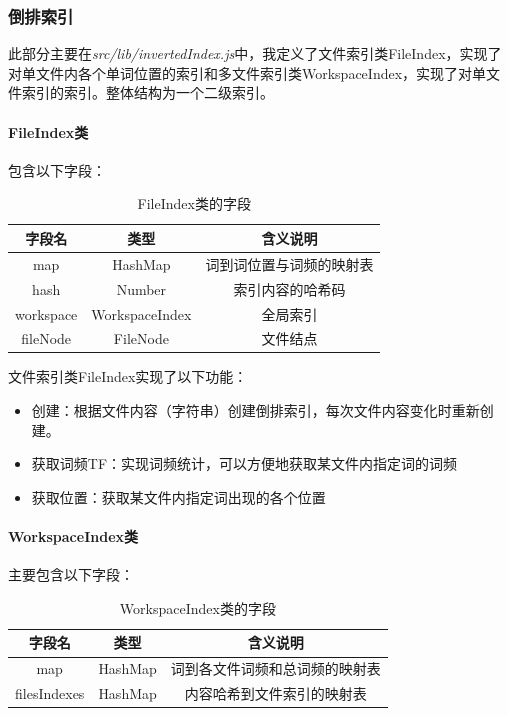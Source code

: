 \documentclass[scheme = chinese]{ctexart}
\begin{document}
\subsubsection{倒排索引}
此部分主要在\emph{src/lib/invertedIndex.js}中，我定义了文件索引类FileIndex，实现了对单文件内各个单词位置的索引和多文件索引类WorkspaceIndex，实现了对单文件索引的索引。整体结构为一个二级索引。

\paragraph{FileIndex类} 包含以下字段：
\begin{table}[H]
    \centering
    \caption{FileIndex类的字段}
    \begin{tabular}{ccc}
        \toprule
        字段名 & 类型 & 含义说明 \\
        \midrule
        map & HashMap & 词到词位置与词频的映射表 \\
        hash & Number & 索引内容的哈希码 \\
        workspace & WorkspaceIndex & 全局索引 \\
        fileNode & FileNode & 文件结点 \\
        \bottomrule
    \end{tabular}
\end{table}

文件索引类FileIndex实现了以下功能：
\begin{itemize}
    \item 创建：根据文件内容（字符串）创建倒排索引，每次文件内容变化时重新创建。
    \item 获取词频TF：实现词频统计，可以方便地获取某文件内指定词的词频
    \item 获取位置：获取某文件内指定词出现的各个位置
\end{itemize}

\paragraph{WorkspaceIndex类} 主要包含以下字段：
\begin{table}[H]
    \centering
    \caption{WorkspaceIndex类的字段}
    \begin{tabular}{ccc}
        \toprule
        字段名 & 类型 & 含义说明 \\
        \midrule
        map & HashMap & 词到各文件词频和总词频的映射表 \\
        filesIndexes & HashMap & 内容哈希到文件索引的映射表 \\
        \bottomrule
    \end{tabular}
\end{table}
\end{document}

